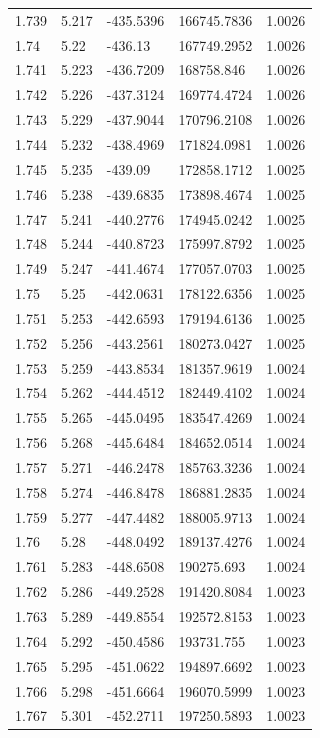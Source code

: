 \begin{tabular}{lllll}
1.739 & 5.217 & -435.5396 & 166745.7836 & 1.0026 \\
1.74 & 5.22 & -436.13 & 167749.2952 & 1.0026 \\
1.741 & 5.223 & -436.7209 & 168758.846 & 1.0026 \\
1.742 & 5.226 & -437.3124 & 169774.4724 & 1.0026 \\
1.743 & 5.229 & -437.9044 & 170796.2108 & 1.0026 \\
1.744 & 5.232 & -438.4969 & 171824.0981 & 1.0026 \\
1.745 & 5.235 & -439.09 & 172858.1712 & 1.0025 \\
1.746 & 5.238 & -439.6835 & 173898.4674 & 1.0025 \\
1.747 & 5.241 & -440.2776 & 174945.0242 & 1.0025 \\
1.748 & 5.244 & -440.8723 & 175997.8792 & 1.0025 \\
1.749 & 5.247 & -441.4674 & 177057.0703 & 1.0025 \\
1.75 & 5.25 & -442.0631 & 178122.6356 & 1.0025 \\
1.751 & 5.253 & -442.6593 & 179194.6136 & 1.0025 \\
1.752 & 5.256 & -443.2561 & 180273.0427 & 1.0025 \\
1.753 & 5.259 & -443.8534 & 181357.9619 & 1.0024 \\
1.754 & 5.262 & -444.4512 & 182449.4102 & 1.0024 \\
1.755 & 5.265 & -445.0495 & 183547.4269 & 1.0024 \\
1.756 & 5.268 & -445.6484 & 184652.0514 & 1.0024 \\
1.757 & 5.271 & -446.2478 & 185763.3236 & 1.0024 \\
1.758 & 5.274 & -446.8478 & 186881.2835 & 1.0024 \\
1.759 & 5.277 & -447.4482 & 188005.9713 & 1.0024 \\
1.76 & 5.28 & -448.0492 & 189137.4276 & 1.0024 \\
1.761 & 5.283 & -448.6508 & 190275.693 & 1.0024 \\
1.762 & 5.286 & -449.2528 & 191420.8084 & 1.0023 \\
1.763 & 5.289 & -449.8554 & 192572.8153 & 1.0023 \\
1.764 & 5.292 & -450.4586 & 193731.755 & 1.0023 \\
1.765 & 5.295 & -451.0622 & 194897.6692 & 1.0023 \\
1.766 & 5.298 & -451.6664 & 196070.5999 & 1.0023 \\
1.767 & 5.301 & -452.2711 & 197250.5893 & 1.0023 \\

\end{tabular}
